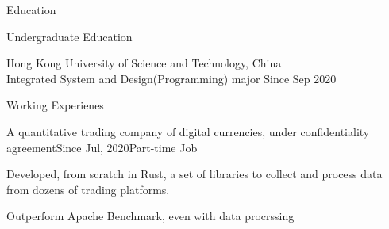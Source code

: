 \documentclass{resume} %
\begin{document}
\begin{rSection}{Education}

    \begin{rSubsection}{Undergraduate Education}{}{}{} 
        \item Hong Kong University of Science and Technology, China \\ Integrated System and Design(Programming) major \hfill Since Sep 2020
    \end{rSubsection}
\end{rSection}
\begin{rSection}{Working Experienes}
    \begin{rSubsection}{A quantitative trading company of digital currencies, under confidentiality agreement}{Since Jul, 2020}{Part-time Job}{}
        \item Developed, from scratch in Rust, a set of libraries to collect and process data from dozens of trading platforms.
        \item Outperform Apache Benchmark, even with data procrssing
\end{rSubsection}

\end{rSection}
\end{document}

